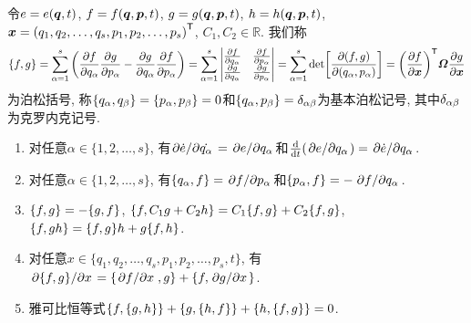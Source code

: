 \begin{proposition}[泊松括号]\label{pro:泊松括号}
    令$ e=e(\vb*{q},t) $, $ f=f(\vb*{q},\vb*{p},t) $, $ g=g(\vb*{q},\vb*{p},t) $, $ h=h(\vb*{q},\vb*{p},t) $, $ \vb*{x}={(q_1,q_2,\ldots,q_s,p_1,p_2,\ldots,p_s)}^{\mathsf{T}} $, $ C_1,C_2 \in \mathbb{R} $. 我们称
    \begin{equation*}
        \pb{f}{g} = \sum_{\alpha=1}^s \bigg(\pdv{f}{q_{\alpha}}\pdv{g}{p_{\alpha}} - \pdv{g}{q_{\alpha}}\pdv{f}{p_{\alpha}}\bigg)=\sum_{\alpha=1}^s \mdet{\pdv{f}{q_{\alpha}} & \pdv{f}{p_{\alpha}} \\ \pdv{g}{q_{\alpha}} & \pdv{g}{p_{\alpha}}} = \sum_{\alpha=1}^s \det[\pdv{(f,g)}{(q_{\alpha},p_{\alpha})}] = \transpose{\bigg(\pdv{f}{\vb*{x}}\bigg)} \vb*{\varOmega} \pdv{g}{\vb*{x}}
    \end{equation*}
    为泊松括号, 称$ \pb{q_{\alpha}}{q_{\beta}}=\pb{p_{\alpha}}{p_{\beta}}=0 $和$ \pb{q_{\alpha}}{p_{\beta}}=\kron{\alpha}{\beta} $为基本泊松记号, 其中$ \delta_{\alpha\beta} $为克罗内克记号.
    \begin{enumerate}
        \item 对任意$ \alpha \in \{1,2,\ldots,s\} $, 有$ \pdv*{\dot{e}}{\dot{q_{\alpha}}} = \pdv*{e}{q_{\alpha}} $和$ \dv{t}(\pdv*{e}{q_{\alpha}}) = \pdv*{\dot{e}}{q_{\alpha}} $.
        \item 对任意$ \alpha \in \{1,2,\ldots,s\} $, 有$ \pb{q_{\alpha}}{f}=\pdv*{f}{p_{\alpha}} $和$ \pb{p_{\alpha}}{f}=-\pdv*{f}{q_{\alpha}} $.
        \item $ \pb{f}{g}=-\pb{g}{f} $, $ \pb{f}{C_1g+C_2h}=C_1\pb{f}{g}+C_2\pb{f}{g} $, $ \pb{f}{gh}=\pb{f}{g}h+g\pb{f}{h} $.
        \item 对任意$ x \in \{q_1,q_2,\ldots,q_s,p_1,p_2,\ldots,p_s,t\} $, 有$ \pdv*{\pb{f}{g}}{x} = \pb{\pdv*{f}{x}}{g} + \pb{f}{\pdv*{g}{x}} $.
        \item 雅可比恒等式$ \pb{f}{\pb{g}{h}}+\pb{g}{\pb{h}{f}}+\pb{h}{\pb{f}{g}}=0 $.
    \end{enumerate}
\end{proposition}

